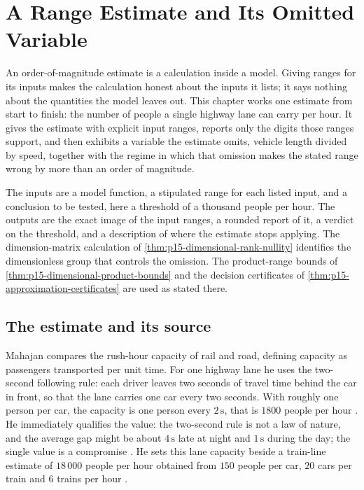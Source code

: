 \chapter{A Range Estimate and Its Omitted Variable}
\label{sec:p15-w02b-p15-073}

An order-of-magnitude estimate is a calculation inside a model. Giving ranges
for its inputs makes the calculation honest about the inputs it lists; it
says nothing about the quantities the model leaves out. This chapter works
one estimate from start to finish: the number of people a single highway
lane can carry per hour. It gives the estimate with explicit input ranges,
reports only the digits those ranges support, and then exhibits a variable
the estimate omits, vehicle length divided by speed, together with the
regime in which that omission makes the stated range wrong by more than an
order of magnitude.

The inputs are a model function, a stipulated range for each listed input,
and a conclusion to be tested, here a threshold of a thousand people per hour.
The outputs are the exact image of the input ranges, a rounded report of it,
a verdict on the threshold, and a description of where the estimate stops
applying. The dimension-matrix calculation of
\cref{thm:p15-dimensional-rank-nullity} identifies the dimensionless group
that controls the omission. The product-range bounds of
\cref{thm:p15-dimensional-product-bounds} and the decision certificates of
\cref{thm:p15-approximation-certificates} are used as stated there.

\section{The estimate and its source}
\label{sec:p15-w02b-p15-073-source}

Mahajan compares the rush-hour capacity of rail and road, defining capacity
as passengers transported per unit time. For one highway lane he uses the
two-second following rule: each driver leaves two seconds of travel time
behind the car in front, so that the lane carries one car every two seconds.
With roughly one person per car, the capacity is one person every
\(2\,\mathrm s\), that is \(1800\) people per hour
\cite[p.~6, eq.~(1.3)]{Mahajan2014Insight}.
He immediately qualifies the value: the two-second rule is not a law of
nature, and the average gap might be about \(4\,\mathrm s\) late at night and
\(1\,\mathrm s\) during the day; the single value is a compromise
\cite[p.~7]{Mahajan2014Insight}. He sets this lane capacity beside a
train-line estimate of \(18\,000\) people per hour obtained from
\(150\) people per car, \(20\) cars per train and \(6\) trains per hour
\cite[p.~7, eq.~(1.4)]{Mahajan2014Insight}.

